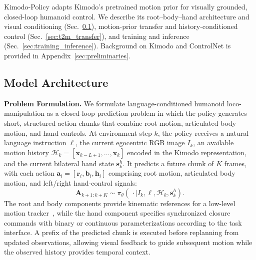 Kimodo-Policy adapts Kimodo's pretrained motion prior for visually grounded, closed-loop humanoid control. We describe its root--body--hand architecture and visual conditioning (Sec.~\ref{sec:method_architecture}), motion-prior transfer and history-conditioned control (Sec.~\ref{sec:t2m_transfer}), and training and inference (Sec.~\ref{sec:training_inference}). Background on Kimodo and ControlNet is provided in Appendix~\ref{sec:preliminaries}.



\subsection{Model Architecture}
\label{sec:method_architecture}

\textbf{Problem Formulation.} We formulate language-conditioned humanoid loco-manipulation as a closed-loop prediction problem in which the policy generates short, structured action chunks that combine root motion, articulated body motion, and hand controls. At environment step $k$, the policy receives a natural-language instruction $\ell$, the current egocentric RGB image $I_k$, an available motion history $\mathcal{H}_k=[\mathbf{x}_{k-L+1},\ldots,\mathbf{x}_k]$ encoded in the Kimodo representation, and the current bilateral hand state $\mathbf{s}^{h}_k$. It predicts a future chunk of $K$ frames, with each action $\mathbf{a}_i=[\mathbf{r}_i,\mathbf{b}_i,\mathbf{h}_i]$ comprising root motion, articulated body motion, and left/right hand-control signals:
\begin{equation}
  \mathbf{A}_{k+1:k+K}\sim\pi_{\theta}(\,\cdot\mid I_k,\ell,\mathcal{H}_k,\mathbf{s}^{h}_k).
  \label{eq:policy_formulation}
\end{equation}
The root and body components provide kinematic references for a low-level motion tracker~\cite{ze2025twist2scalableportableholistic,guan2026limmtmotiontracking}, while the hand component specifies synchronized closure commands with binary or continuous parameterizations according to the task interface. A prefix of the predicted chunk is executed before replanning from updated observations, allowing visual feedback to guide subsequent motion while the observed history provides temporal context.



